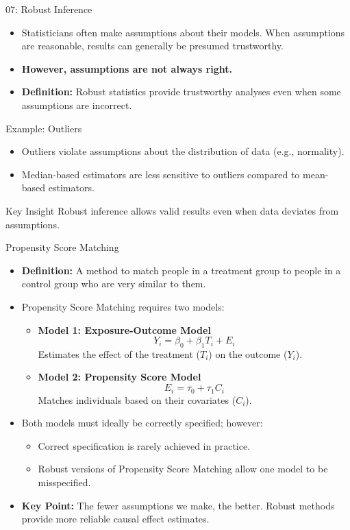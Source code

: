 \documentclass{beamer}
\begin{document}
\begin{frame}{07: Robust Inference}
\begin{itemize}
    \item Statisticians often make assumptions about their models. When assumptions are reasonable, results can generally be presumed trustworthy.
    \item \textbf{However, assumptions are not always right.}
    \item \textbf{Definition:} Robust statistics provide trustworthy analyses even when some assumptions are incorrect.
\end{itemize}

\begin{block}{Example: Outliers}
\begin{itemize}
    \item Outliers violate assumptions about the distribution of data (e.g., normality).
    \item Median-based estimators are less sensitive to outliers compared to mean-based estimators.
\end{itemize}
\end{block}

\begin{block}{Key Insight}
Robust inference allows valid results even when data deviates from assumptions.
\end{block}
\end{frame}

\begin{frame}{Propensity Score Matching}
\begin{itemize}
    \item \textbf{Definition:} A method to match people in a treatment group to people in a control group who are very similar to them.
    \item Propensity Score Matching requires two models:
    \begin{itemize}
        \item \textbf{Model 1: Exposure-Outcome Model}
        \[
        Y_i = \beta_0 + \beta_1 T_i + E_i
        \]
        Estimates the effect of the treatment (\(T_i\)) on the outcome (\(Y_i\)).
        \item \textbf{Model 2: Propensity Score Model}
        \[
        E_i = \tau_0 + \tau_1 C_i
        \]
        Matches individuals based on their covariates (\(C_i\)).
    \end{itemize}
    \item Both models must ideally be correctly specified; however:
    \begin{itemize}
        \item Correct specification is rarely achieved in practice.
        \item Robust versions of Propensity Score Matching allow one model to be misspecified.
    \end{itemize}
    \item \textbf{Key Point:} The fewer assumptions we make, the better. Robust methods provide more reliable causal effect estimates.
\end{itemize}
\end{frame}
\end{document}
